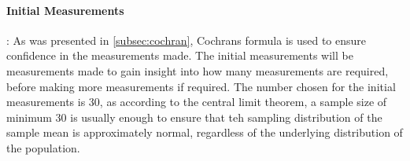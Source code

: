 

\paragraph{Initial Measurements}: As was presented in \cref{subsec:cochran}, Cochrans formula is used to ensure confidence in the measurements made. The initial measurements will be measurements made to gain insight into how many measurements are required, before making more measurements if required. The number chosen for the initial measurements is 30, as according to the central limit theorem, a sample size of minimum 30 is usually enough to ensure that teh sampling distribution of the sample mean is approximately normal, regardless of the underlying distribution of the population.\cite{central-limit-theorem}





